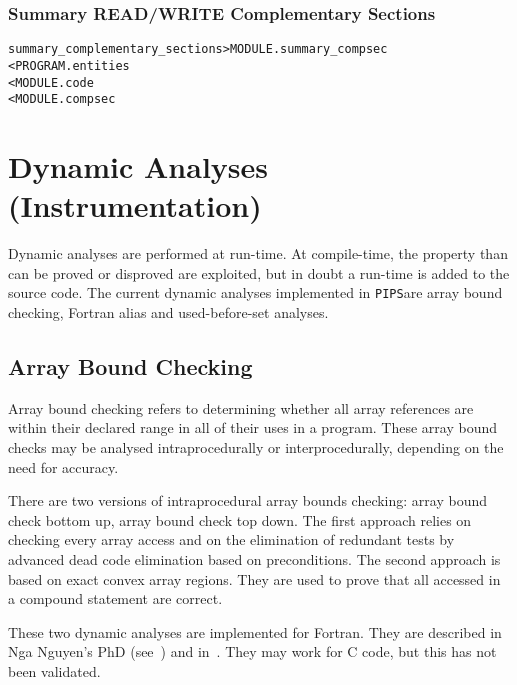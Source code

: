 \documentclass[a4paper]{report}
\newenvironment{PipsMake}{\begin{alltt}}{\end{alltt}}
\newcommand{\Pips}{\texttt{PIPS}}
\begin{document}
\subsection{Summary READ/WRITE Complementary Sections}
\label{subsubsection-summary-complementary-sections}


\begin{PipsMake}
summary_complementary_sections > MODULE.summary_compsec
        < PROGRAM.entities
        < MODULE.code
        < MODULE.compsec
\end{PipsMake}


\chapter{Dynamic Analyses (Instrumentation)}

Dynamic analyses are performed at run-time. At compile-time, the
property than can be proved or disproved are exploited, but in doubt a
run-time is added to the source code. The current dynamic analyses
implemented in \Pips are array bound checking, Fortran alias and
used-before-set analyses.


\section{Array Bound Checking}
\label{subsection-array-bound-checking}

Array bound checking refers to determining whether all array references
are within their declared range in all of their uses in a program. These
array  bound checks may be analysed intraprocedurally or
interprocedurally, depending on the need for accuracy.

There are two versions of intraprocedural array bounds checking: array
bound check bottom up, array bound check top down. The first approach
relies on checking every array access and on the elimination of
redundant tests by advanced dead code elimination based on
preconditions. The second approach is based on exact convex array
regions. They are used to prove that all accessed in a compound
statement are correct.

These two dynamic analyses are implemented for Fortran. They are
described in Nga Nguyen's PhD (see~\cite{Ngu02}) and in~\cite{NI05}. They
may work for C code, but this has not been validated.
\end{document}

